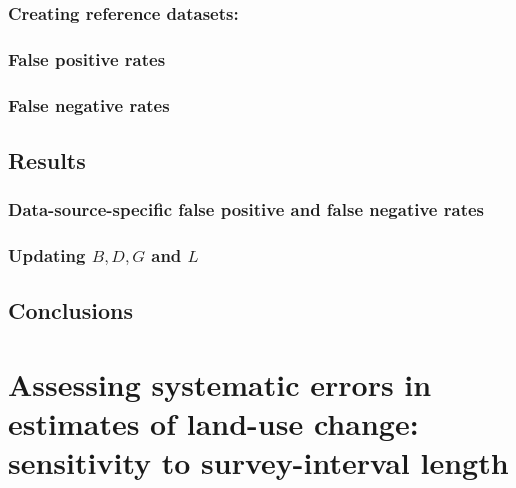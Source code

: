 \documentclass[
]{book}
\begin{document}
\hypertarget{creating-reference-datasets}{%
\subsection{Creating reference datasets:}\label{creating-reference-datasets}}

\hypertarget{false-positive-rates}{%
\subsection{False positive rates}\label{false-positive-rates}}

\hypertarget{false-negative-rates}{%
\subsection{False negative rates}\label{false-negative-rates}}

\hypertarget{results-1}{%
\section{Results}\label{results-1}}

\hypertarget{data-source-specific-false-positive-and-false-negative-rates}{%
\subsection{Data-source-specific false positive and false negative rates}\label{data-source-specific-false-positive-and-false-negative-rates}}

\hypertarget{updating-b-d-g-and-l}{%
\subsection{\texorpdfstring{Updating \(B, D, G\) and \(L\)}{Updating B, D, G and L}}\label{updating-b-d-g-and-l}}

\hypertarget{conclusions}{%
\section{Conclusions}\label{conclusions}}

\hypertarget{assessing-systematic-errors-in-estimates-of-land-use-change-sensitivity-to-survey-interval-length}{%
\chapter{Assessing systematic errors in estimates of land-use change: sensitivity to survey-interval length}\label{assessing-systematic-errors-in-estimates-of-land-use-change-sensitivity-to-survey-interval-length}}
\end{document}
